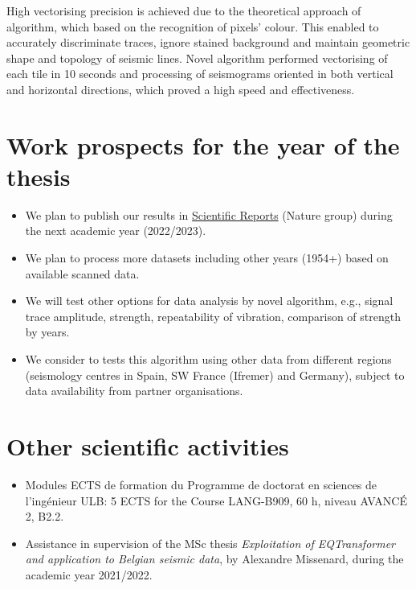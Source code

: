 \documentclass[a4paper,english,12pt]{article}
\begin{document}
High vectorising precision is achieved due to the theoretical approach of algorithm, which based on the recognition of pixels' colour. This enabled to accurately discriminate traces, ignore stained background and maintain geometric shape and topology of seismic lines. Novel algorithm performed vectorising of each tile in 10 seconds and processing of seismograms oriented in both vertical and horizontal directions, which proved a high speed and effectiveness. 

\section{Work prospects for the  year of the thesis}
\begin{itemize}
	\item We plan to publish our results in \href{https://www.nature.com/srep/}{Scientific Reports} (Nature group) during the next academic year (2022/2023). 
	\item We plan to process more datasets including other years (1954+) based on available scanned data. 
	\item We will test other options for data analysis by novel algorithm, e.g., signal trace amplitude, strength, repeatability of vibration, comparison of strength by years.
	\item We consider to tests this algorithm using other data from different regions (seismology centres in Spain, SW France (Ifremer) and Germany), subject to data availability from partner organisations.
\end{itemize}

\section{Other scientific activities}
\begin{itemize}
	\item Modules ECTS de formation du Programme de doctorat en sciences de l'ingénieur ULB: 5 ECTS for the Course LANG-B909, 60 h, niveau AVANC\'{E} 2, B2.2.
	\item Assistance in supervision of the MSc thesis \emph{Exploitation of EQTransformer and application to Belgian seismic data}, by Alexandre Missenard, during the academic year 2021/2022.
\end{itemize}
\end{document}
